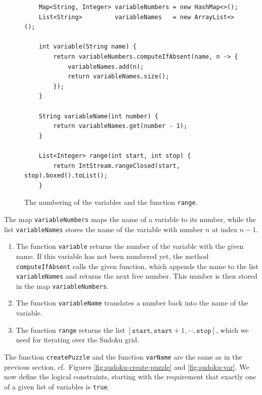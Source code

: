 \begin{figure}[!ht]
  \centering
\begin{verbatim}
    Map<String, Integer> variableNumbers = new HashMap<>();
    List<String>         variableNames   = new ArrayList<>();

    int variable(String name) {
        return variableNumbers.computeIfAbsent(name, n -> {
            variableNames.add(n);
            return variableNames.size();
        });
    }

    String variableName(int number) {
        return variableNames.get(number - 1);
    }

    List<Integer> range(int start, int stop) {
        return IntStream.rangeClosed(start, stop).boxed().toList();
    }
\end{verbatim}
\vspace*{-0.3cm}
  \caption{The numbering of the variables and the function \texttt{range}.}
  \label{fig:sat4j-variable}
\end{figure}

\noindent
The map \texttt{variableNumbers} maps the name of a variable to its number, while the list \texttt{variableNames}
stores the name of the variable with number $n$ at index $n-1$.  
\begin{enumerate}
\item The function \texttt{variable} returns the number of the variable with the given name.  If this variable
      has not been numbered yet, the method \texttt{computeIfAbsent} calls the given function, which appends
      the name to the list \texttt{variableNames} and returns the next free number.  This number is then stored
      in the map \texttt{variableNumbers}.
\item The function \texttt{variableName} translates a number back into the name of the variable.
\item The function \texttt{range} returns the list $[\texttt{start}, \texttt{start}+1, \cdots, \texttt{stop}]$,
      which we need for iterating over the Sudoku grid.
\end{enumerate}
The function \texttt{createPuzzle} and the function \texttt{varName} are the same as in the previous section,
cf.~Figures \ref{fig:sudoku-create-puzzle} and \ref{fig:sudoku-var}.  
We now define the logical constraints, starting with the requirement that exactly one of a given list of
variables is \texttt{true}.


